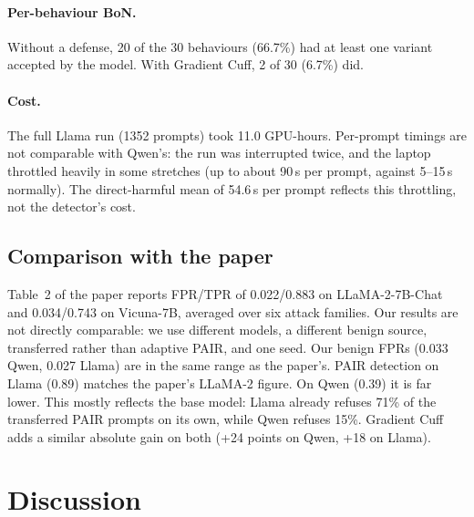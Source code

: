 \documentclass[11pt,a4paper]{article}
\begin{document}
\paragraph{Per-behaviour BoN.} Without a defense, 20 of the 30 behaviours (66.7\%) had at least one variant accepted by the model. With Gradient Cuff, 2 of 30 (6.7\%) did.

\paragraph{Cost.} The full Llama run (1352 prompts) took 11.0 GPU-hours. Per-prompt timings are not comparable with Qwen's: the run was interrupted twice, and the laptop throttled heavily in some stretches (up to about 90\,s per prompt, against 5--15\,s normally). The direct-harmful mean of 54.6\,s per prompt reflects this throttling, not the detector's cost.

\subsection{Comparison with the paper}

Table~2 of the paper reports FPR/TPR of 0.022/0.883 on LLaMA-2-7B-Chat and 0.034/0.743 on Vicuna-7B, averaged over six attack families. Our results are not directly comparable: we use different models, a different benign source, transferred rather than adaptive PAIR, and one seed. Our benign FPRs (0.033 Qwen, 0.027 Llama) are in the same range as the paper's. PAIR detection on Llama (0.89) matches the paper's LLaMA-2 figure. On Qwen (0.39) it is far lower. This mostly reflects the base model: Llama already refuses 71\% of the transferred PAIR prompts on its own, while Qwen refuses 15\%. Gradient Cuff adds a similar absolute gain on both (+24 points on Qwen, +18 on Llama).

\section{Discussion}
\end{document}

